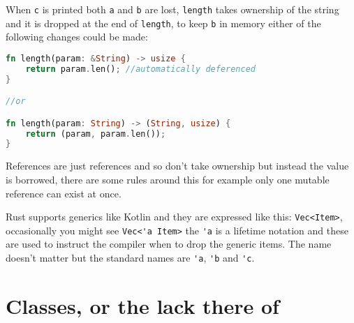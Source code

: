 \documentclass[a4paper,11pt]{article}
\begin{document}
When \lstinline{c} is printed both \lstinline{a} and \lstinline{b} are lost, \lstinline{length} takes ownership of the string and it is dropped at the end of \lstinline{length}, to keep \lstinline{b} in memory either of the following changes could be made:
\begin{lstlisting}[language=Rust,frame=single]
fn length(param: &String) -> usize {
	return param.len(); //automatically deferenced
}

//or

fn length(param: String) -> (String, usize) {
	return (param, param.len()); 
}
\end{lstlisting}

References are just references and so don't take ownership but instead the value is borrowed, there are some rules around this for example only one mutable reference can exist at once.

Rust supports generics like Kotlin and they are expressed like this: \lstinline{Vec<Item>}, occasionally you might see \lstinline{Vec<'a Item>} the \lstinline{'a} is a lifetime notation and these are used to instruct the compiler when to drop the generic items. The name doesn't matter but the standard names are \lstinline{'a}, \lstinline{'b} and \lstinline{'c}.

\newpage
\section{Classes, or the lack there of}
\end{document}

